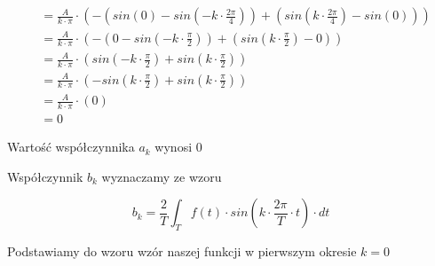 \begin{equation}
\begin{aligned}
&=\frac{A}{k \cdot \pi} \cdot \left(- \left( sin\left( 0 \right) - sin\left( - k \cdot \frac{2\pi}{4} \right) \right)
+ \left( sin\left( k \cdot \frac{2\pi}{4} \right) - sin\left( 0 \right)\right) \right)\\
&=\frac{A}{k \cdot \pi} \cdot \left(- \left( 0 - sin\left( - k \cdot \frac{\pi}{2} \right) \right)
+ \left( sin\left( k \cdot \frac{\pi}{2} \right) - 0\right) \right)\\
&=\frac{A}{k \cdot \pi} \cdot \left(sin\left( - k \cdot \frac{\pi}{2} \right)
+ sin\left( k \cdot \frac{\pi}{2} \right) \right)\\
&=\frac{A}{k \cdot \pi} \cdot \left(- sin\left( k \cdot \frac{\pi}{2} \right)
+ sin\left( k \cdot \frac{\pi}{2} \right) \right)\\
&=\frac{A}{k \cdot \pi} \cdot \left(0 \right)\\
&=0
\end{aligned}
\end{equation}

Wartość współczynnika $a_k$ wynosi $0$


Współczynnik $b_k$ wyznaczamy ze wzoru

\begin{equation}
b_k=\frac{2}{T}\int_{T}f(t) \cdot sin\left( k \cdot \frac{2\pi}{T} \cdot t\right) \cdot dt
\end{equation}

Podstawiamy do wzoru wzór naszej funkcji w pierwszym okresie $k=0$

